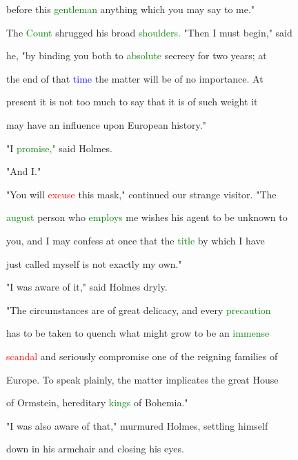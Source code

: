  before this \textcolor{green}{gentleman} anything which you may say to me."



 The \textcolor{green}{Count} shrugged his broad \textcolor{green}{shoulders.} "Then I must begin," said

 he, "by binding you both to \textcolor{green}{absolute} \textcolor{BurntOrange}{secrecy} for two years; at

 the end of that \textcolor{blue}{time} the matter will be of no \textcolor{BurntOrange}{importance.} At

 \textcolor{BurntOrange}{present} it is not too much to say that it is of such \textcolor{BurntOrange}{weight} it

 may have an \textcolor{BurntOrange}{influence} upon European history."



 "I \textcolor{green}{promise,"} said Holmes.



 "And I."



 "You will \textcolor{red}{excuse} this mask," continued our strange \textcolor{BurntOrange}{visitor.} "The

 \textcolor{green}{august} person who \textcolor{green}{employs} me wishes his agent to be \textcolor{BurntOrange}{unknown} to

 you, and I may \textcolor{BurntOrange}{confess} at once that the \textcolor{green}{title} by which I have

 just called myself is not exactly my own."



 "I was aware of it," said Holmes dryly.



 "The circumstances are of great delicacy, and every \textcolor{green}{precaution}

 has to be taken to quench what might \textcolor{BurntOrange}{grow} to be an \textcolor{green}{immense}

 \textcolor{red}{scandal} and seriously compromise one of the reigning families of

 Europe. To speak plainly, the matter implicates the great House

 of Ormstein, hereditary \textcolor{green}{kings} of Bohemia."



 "I was also aware of that," murmured Holmes, settling himself

 down in his armchair and closing his eyes.




